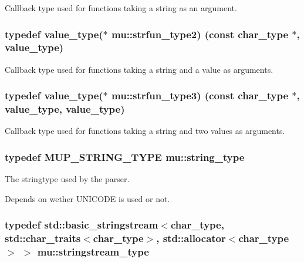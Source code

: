Callback type used for functions taking a string as an argument. 

\subsubsection[{\texorpdfstring{strfun\+\_\+type2}{strfun_type2}}]{\setlength{\rightskip}{0pt plus 5cm}typedef {\bf value\+\_\+type}($\ast$ mu\+::strfun\+\_\+type2) (const {\bf char\+\_\+type} $\ast$, {\bf value\+\_\+type})}\hypertarget{namespacemu_a14b9af8ec1e328b685221ca23fc9f765}{}\label{namespacemu_a14b9af8ec1e328b685221ca23fc9f765}


Callback type used for functions taking a string and a value as arguments. 

\subsubsection[{\texorpdfstring{strfun\+\_\+type3}{strfun_type3}}]{\setlength{\rightskip}{0pt plus 5cm}typedef {\bf value\+\_\+type}($\ast$ mu\+::strfun\+\_\+type3) (const {\bf char\+\_\+type} $\ast$, {\bf value\+\_\+type}, {\bf value\+\_\+type})}\hypertarget{namespacemu_a1ce7a16b2a2b87f662819b7ee1d87bc0}{}\label{namespacemu_a1ce7a16b2a2b87f662819b7ee1d87bc0}


Callback type used for functions taking a string and two values as arguments. 

\subsubsection[{\texorpdfstring{string\+\_\+type}{string_type}}]{\setlength{\rightskip}{0pt plus 5cm}typedef {\bf M\+U\+P\+\_\+\+S\+T\+R\+I\+N\+G\+\_\+\+T\+Y\+PE} {\bf mu\+::string\+\_\+type}}\hypertarget{namespacemu_ae9f8b44d9a97dd397180891e8390c3e9}{}\label{namespacemu_ae9f8b44d9a97dd397180891e8390c3e9}


The stringtype used by the parser. 

Depends on wether U\+N\+I\+C\+O\+DE is used or not. 
\subsubsection[{\texorpdfstring{stringstream\+\_\+type}{stringstream_type}}]{\setlength{\rightskip}{0pt plus 5cm}typedef std\+::basic\+\_\+stringstream$<${\bf char\+\_\+type}, std\+::char\+\_\+traits$<${\bf char\+\_\+type}$>$, std\+::allocator$<${\bf char\+\_\+type}$>$ $>$ {\bf mu\+::stringstream\+\_\+type}}\hypertarget{namespacemu_ab3b60f8311eb24cf437182a8d5125774}{}\label{namespacemu_ab3b60f8311eb24cf437182a8d5125774}



